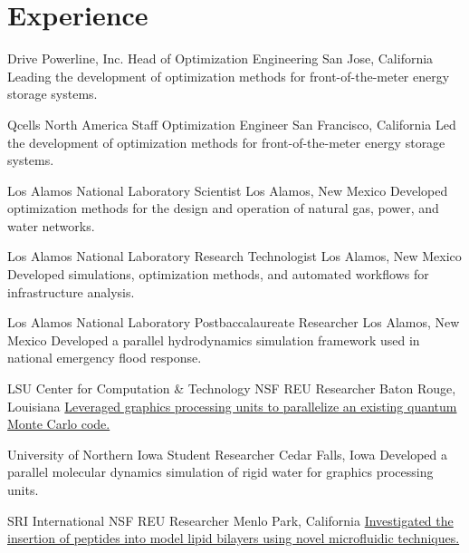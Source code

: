 \section{Experience}
		{Drive Powerline, Inc.}
		{Head of Optimization Engineering}
		{San Jose, California}{}
		{Leading the development of optimization methods for front-of-the-meter energy storage systems.}

		{Qcells North America}
		{Staff Optimization Engineer}
		{San Francisco, California}{}
		{Led the development of optimization methods for front-of-the-meter energy storage systems.}

		{Los Alamos National Laboratory}
		{Scientist}
		{Los Alamos, New Mexico}{}
		{Developed optimization methods for the design and operation of natural gas, power, and water networks.}

		{Los Alamos National Laboratory}
		{Research Technologist}
		{Los Alamos, New Mexico}{}
		{Developed simulations, optimization methods, and automated workflows for infrastructure analysis.}

		{Los Alamos National Laboratory}
		{Postbaccalaureate Researcher}
		{Los Alamos, New Mexico}{}
		{Developed a parallel hydrodynamics simulation framework used in national emergency flood response.}

		{LSU Center for Computation \& Technology}
		{NSF REU Researcher}
		{Baton Rouge, Louisiana}{}
		{\href{http://www.institute.loni.org/lasigma/package/vmc/}{Leveraged graphics processing units to parallelize an existing quantum Monte Carlo code.}}

		{University of Northern Iowa}
		{Student Researcher}
		{Cedar Falls, Iowa}{}
		{Developed a parallel molecular dynamics simulation of rigid water for graphics processing units.}

		{SRI International}
		{NSF REU Researcher}
		{Menlo Park, California}{}
		{\href{https://www.sri.com/wp-content/uploads/2019/12/sri-reu-2011-2.pdf}{Investigated the insertion of peptides into model lipid bilayers using novel microfluidic techniques.}}


